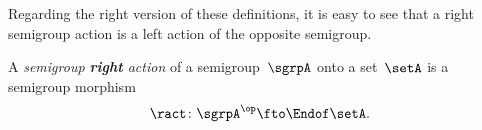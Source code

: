Regarding the right version of these definitions, it is easy to see that a right semigroup action is a left action of the opposite semigroup.


\begin{ctdefinition}\label{def:semigroup-right-action}
  A \emph{semigroup \textbf{right} action} of a semigroup~$\sgrpA$ onto a set~$\setA$ is a semigroup morphism
  \begin{equation}
    \ract \colon \sgrpA^{\op} \fto \Endof\setA.
  \end{equation}
\end{ctdefinition}

